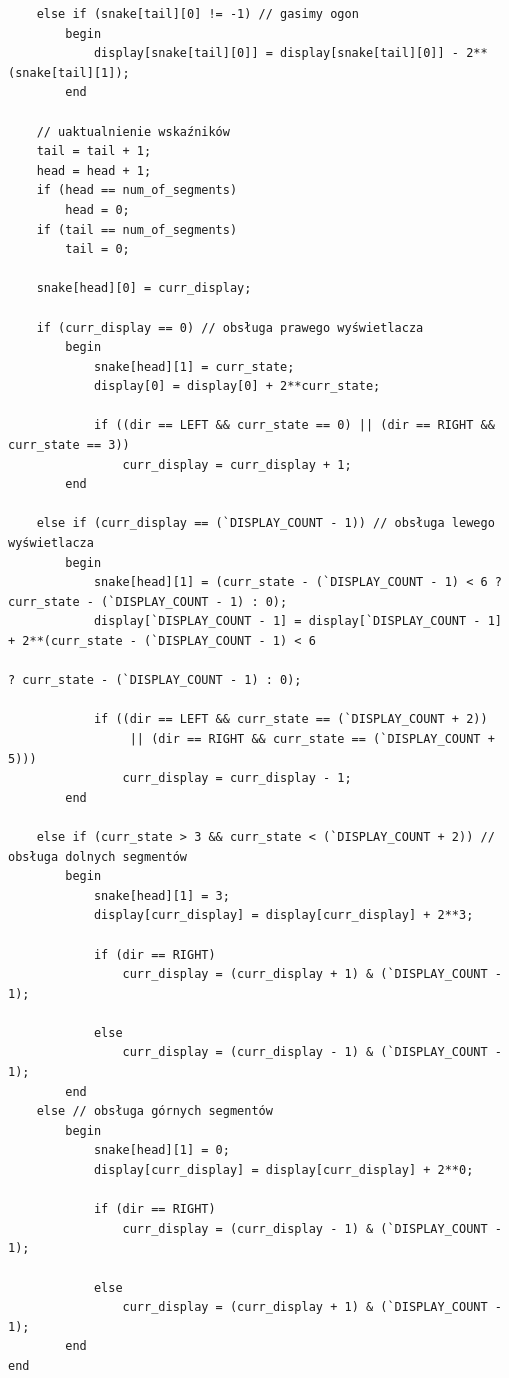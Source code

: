 \documentclass[a4paper]{article}
\begin{document}
\begin{verbatim}
    else if (snake[tail][0] != -1) // gasimy ogon
        begin
            display[snake[tail][0]] = display[snake[tail][0]] - 2**(snake[tail][1]);
        end
        
    // uaktualnienie wskaźników
    tail = tail + 1;
    head = head + 1;
    if (head == num_of_segments)
        head = 0;
    if (tail == num_of_segments)
        tail = 0;
    
    snake[head][0] = curr_display;

    if (curr_display == 0) // obsługa prawego wyświetlacza
        begin           
            snake[head][1] = curr_state;
            display[0] = display[0] + 2**curr_state;
            
            if ((dir == LEFT && curr_state == 0) || (dir == RIGHT && curr_state == 3))
                curr_display = curr_display + 1;
        end
    
    else if (curr_display == (`DISPLAY_COUNT - 1)) // obsługa lewego wyświetlacza
        begin
            snake[head][1] = (curr_state - (`DISPLAY_COUNT - 1) < 6 ? curr_state - (`DISPLAY_COUNT - 1) : 0);
            display[`DISPLAY_COUNT - 1] = display[`DISPLAY_COUNT - 1] + 2**(curr_state - (`DISPLAY_COUNT - 1) < 6 
                                                                            ? curr_state - (`DISPLAY_COUNT - 1) : 0);
            
            if ((dir == LEFT && curr_state == (`DISPLAY_COUNT + 2)) 
                 || (dir == RIGHT && curr_state == (`DISPLAY_COUNT + 5)))
                curr_display = curr_display - 1;
        end
                
    else if (curr_state > 3 && curr_state < (`DISPLAY_COUNT + 2)) // obsługa dolnych segmentów
        begin
            snake[head][1] = 3;
            display[curr_display] = display[curr_display] + 2**3;
            
            if (dir == RIGHT)
                curr_display = (curr_display + 1) & (`DISPLAY_COUNT - 1);
            
            else
                curr_display = (curr_display - 1) & (`DISPLAY_COUNT - 1);
        end
    else // obsługa górnych segmentów
        begin
            snake[head][1] = 0;
            display[curr_display] = display[curr_display] + 2**0;
            
            if (dir == RIGHT)
                curr_display = (curr_display - 1) & (`DISPLAY_COUNT - 1);

            else
                curr_display = (curr_display + 1) & (`DISPLAY_COUNT - 1);
        end
end




\end{verbatim}
\end{document}
